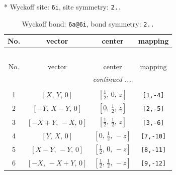 \documentclass[fleqn,8pt]{jsarticle}
\begin{document}
* Wyckoff site: {\tt 6i}, site symmetry: {\tt 2..}
\renewcommand{\arraystretch}{1.2}
\begin{longtable}{cccc}
\caption{Wyckoff bond: {\tt 6a@6i}, bond symmetry: {\tt 2..}}
 \\
 \hline \hline
No. & vector & center & mapping \\ \hline \endfirsthead

\multicolumn{3}{l}{\tablename\ \thetable{}} \\
 \hline \hline
No. & vector & center & mapping \\ \hline \endhead

 \hline \hline
\multicolumn{3}{r}{\footnotesize\it continued ...} \\ \endfoot

 \hline \hline
\multicolumn{3}{r}{} \\ \endlastfoot

1 & $\left[ X,\, Y,\, 0 \right]$ & $\left[ \frac{1}{2},\, 0,\, z \right]$ & {\tt [1,-4]} \\ \hline
2 & $\left[ - Y,\, X - Y,\, 0 \right]$ & $\left[ 0,\, \frac{1}{2},\, z \right]$ & {\tt [2,-5]} \\ \hline
3 & $\left[ - X + Y,\, - X,\, 0 \right]$ & $\left[ \frac{1}{2},\, \frac{1}{2},\, z \right]$ & {\tt [3,-6]} \\ \hline
4 & $\left[ Y,\, X,\, 0 \right]$ & $\left[ 0,\, \frac{1}{2},\, - z \right]$ & {\tt [7,-10]} \\ \hline
5 & $\left[ X - Y,\, - Y,\, 0 \right]$ & $\left[ \frac{1}{2},\, 0,\, - z \right]$ & {\tt [8,-11]} \\ \hline
6 & $\left[ - X,\, - X + Y,\, 0 \right]$ & $\left[ \frac{1}{2},\, \frac{1}{2},\, - z \right]$ & {\tt [9,-12]} \\
\end{longtable}
\renewcommand{\arraystretch}{1.2}
\end{document}
